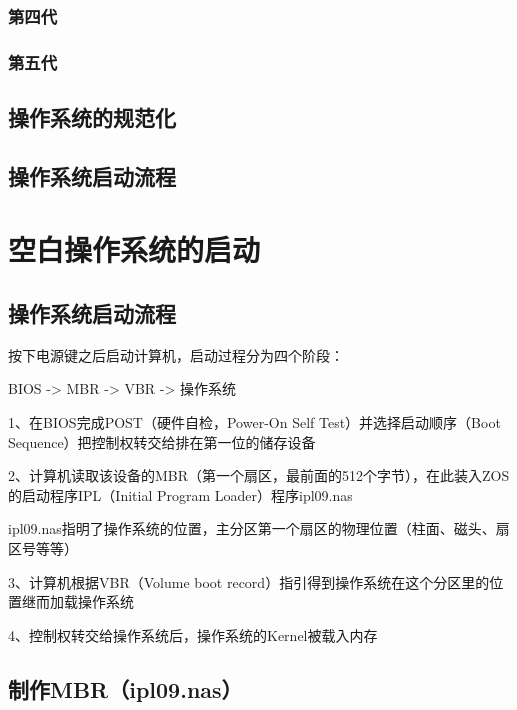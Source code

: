 \documentclass{swfcthesis}
\begin{document}
		\subsection{第四代}

		\subsection{第五代}

	\section{操作系统的规范化}

	\section{操作系统启动流程}


\chapter{空白操作系统的启动}

	\section{操作系统启动流程}

	按下电源键之后启动计算机，启动过程分为四个阶段\cite{hbt}：

		\begin{center}BIOS -> MBR -> VBR -> 操作系统\end{center}
		
		1、在BIOS完成POST（硬件自检，Power-On Self Test）并选择启动顺序（Boot Sequence）把控制权转交给排在第一位的储存设备
		
		2、计算机读取该设备的MBR（第一个扇区，最前面的512个字节），在此装入ZOS的启动程序IPL（Initial Program Loader）程序ipl09.nas
		
		\hspace*{1cm}ipl09.nas指明了操作系统的位置，主分区第一个扇区的物理位置（柱面、磁头、扇区号等等）

		3、计算机根据VBR（Volume boot record）指引得到操作系统在这个分区里的位置继而加载操作系统
		
		4、控制权转交给操作系统后，操作系统的Kernel被载入内存
		
	\section{制作MBR（ipl09.nas）}
\end{document}

